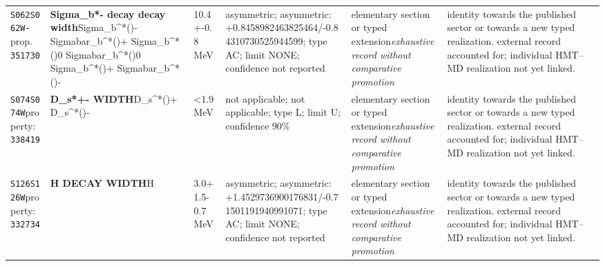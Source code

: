 \begin{landscape}
\begin{longtable}{L{1.85cm}L{4.45cm}L{2.35cm}L{4.05cm}L{3.35cm}L{7.15cm}}
\texttt{S062}\newline \texttt{S062W-}\newline prop.\ \texttt{351730} & \textbf{Sigma\_\allowbreak{}b*- decay decay width}\newline Sigma\_\allowbreak{}b\textasciicircum{}*()- \textbar{}\allowbreak{} Sigmabar\_\allowbreak{}b\textasciicircum{}*()+ \textbar{}\allowbreak{} Sigma\_\allowbreak{}b\textasciicircum{}*()0 \textbar{}\allowbreak{} Sigmabar\_\allowbreak{}b\textasciicircum{}*()0 \textbar{}\allowbreak{} Sigma\_\allowbreak{}b\textasciicircum{}*()+ \textbar{}\allowbreak{} Sigmabar\_\allowbreak{}b\textasciicircum{}*()- & 10.4+-0.8\,MeV & asymmetric; asymmetric: +0.8458982463825464/-0.84310730525944599; type AC; limit NONE; confidence not reported & elementary section or typed extension\newline \emph{exhaustive record without comparative promotion} & identity towards the published sector or towards a new typed realization. external record accounted for; individual HMT--MD realization not yet linked. \\
\texttt{S074}\newline \texttt{S074W}\newline property:\ \texttt{338419} & \textbf{D\_\allowbreak{}s*+- WIDTH}\newline D\_\allowbreak{}s\textasciicircum{}*()+ \textbar{}\allowbreak{} D\_\allowbreak{}s\textasciicircum{}*()- & \textless{}1.9\,MeV & not applicable; not applicable; type L; limit U; confidence 90\% & elementary section or typed extension\newline \emph{exhaustive record without comparative promotion} & identity towards the published sector or towards a new typed realization. external record accounted for; individual HMT--MD realization not yet linked. \\
\texttt{S126}\newline \texttt{S126W}\newline property:\ \texttt{332734} & \textbf{H DECAY WIDTH}\newline H & 3.0+1.5-0.7\,MeV & asymmetric; asymmetric: +1.4529736900176831/-0.71501191940991071; type AC; limit NONE; confidence not reported & elementary section or typed extension\newline \emph{exhaustive record without comparative promotion} & identity towards the published sector or towards a new typed realization. external record accounted for; individual HMT--MD realization not yet linked. \\
\end{longtable}
\endgroup
\end{landscape}
